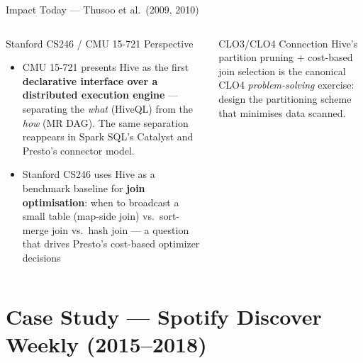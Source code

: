 \documentclass[aspectratio=169,10pt]{beamer}
\begin{document}
\begin{frame}{Impact Today — Thusoo et al.\ (2009, 2010)}
\begin{columns}[T]
      \begin{exampleblock}{Stanford CS246 / CMU 15-721 Perspective}
        \begin{itemize}
          \item CMU 15-721 presents Hive as the first
                \textbf{declarative interface over a distributed
                execution engine} — separating the \emph{what}
                (HiveQL) from the \emph{how} (MR DAG).
                The same separation reappears in Spark SQL's
                Catalyst and Presto's connector model.
          \item Stanford CS246 uses Hive as a benchmark baseline
                for \textbf{join optimisation}: when to broadcast
                a small table (map-side join) vs.\ sort-merge join
                vs.\ hash join — a question that drives Presto's
                cost-based optimizer decisions
        \end{itemize}
      \end{exampleblock}
      \vspace{4pt}
      \begin{alertblock}{CLO3/CLO4 Connection}
        Hive's partition pruning + cost-based join selection
        is the canonical CLO4 \emph{problem-solving} exercise:
        design the partitioning scheme that minimises data scanned.
      \end{alertblock}
  \end{columns}
\end{frame}

\section{Case Study — Spotify Discover Weekly (2015--2018)}
\end{document}
